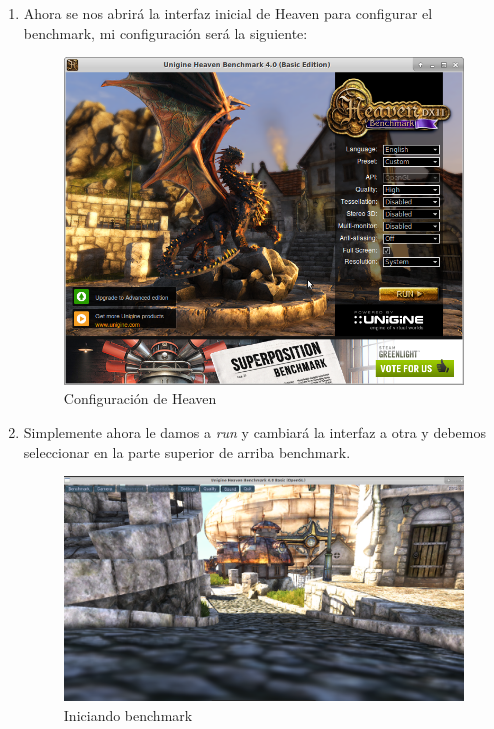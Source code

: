 \begin{enumerate}
	\item Ahora se nos abrirá la interfaz inicial de Heaven para configurar el benchmark, mi configuración será la siguiente:
	
	\begin{figure}[H] %
		\centering
		\includegraphics[scale=0.3]{pics/heaven4}  %
		\caption{Configuración de Heaven} \label{fig:HEAVEN4}
	\end{figure}
	
	\item Simplemente ahora le damos a \textit{run} y cambiará la interfaz a otra y debemos seleccionar en la parte superior de arriba benchmark.
	
	\begin{figure}[H] %
		\centering
		\includegraphics[scale=0.3]{pics/heaven6}  %
		\caption{Iniciando benchmark} \label{fig:HEAVEN5}
	\end{figure}


\end{enumerate}
